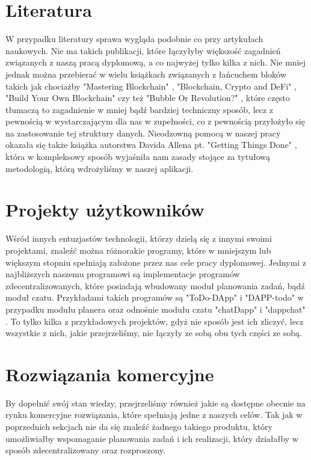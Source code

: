\section{Literatura}
\label{sec:Literatura}
W przypadku literatury sprawa wygląda podobnie co przy artykułach naukowych. Nie ma takich publikacji, które łączyłyby większość zagadnień związanych z naszą pracą dyplomową, a co najwyżej tylko kilka z nich. Nie mniej jednak można przebierać w wielu książkach związanych z łańcuchem bloków takich jak chociażby "Mastering Blockchain" \cite{MasteringBlockchain}, "Blockchain, Crypto and DeFi" \cite{BCDF}, "Build Your Own Blockchain" \cite{BuildBlockchain} czy też "Bubble Or Revolution?" \cite{BubbleOrRevolution}, które często tłumaczą to zagadnienie w mniej bądź bardziej techniczny sposób, lecz z pewnością w wystarczającym dla nas w zupełności, co z pewnością przyłożyło się na zastosowanie tej struktury danych. Nieodzowną pomocą w naszej pracy okazała się także książka autorstwa Davida Allena pt. "Getting Things Done" \cite{GTD}, która w kompleksowy sposób wyjaśniła nam zasady stojące za tytułową metodologią, którą wdrożyliśmy w naszej aplikacji. %


\section{Projekty użytkowników}
\label{sec:ProjektyUzytkownikow}
Wśród innych entuzjastów technologii, którzy dzielą się z innymi swoimi projektami, znaleźć można różnorakie programy, które w mniejszym lub większym stopniu spełniają założone przez nas cele pracy dyplomowej. Jednymi z najbliższych naszemu programowi są implementacje programów zdecentralizowanych, które posiadają wbudowany moduł planowania zadań, bądź moduł czatu. Przykładami takich programów są "ToDo-DApp" \cite{ToDo_DApp} i "DAPP-todo" \cite{DAPP_todo} w przypadku modułu planera oraz odnośnie modułu czatu "chatDapp" \cite{chatDapp} i "dappchat" \cite{dappchat}. To tylko kilka z przykładowych projektów, gdyż nie sposób jest ich zliczyć, lecz wszystkie z nich, jakie przejrzeliśmy, nie łączyły ze sobą obu tych części ze sobą.%

\section{Rozwiązania komercyjne}
\label{sec:RozwiazaniaKomercyjne}
By dopełnić swój stan wiedzy, przejrzeliśmy również jakie są dostępne obecnie na rynku komercyjne rozwiązania, które spełniają jedne z naszych celów. Tak jak w poprzednich sekcjach nie da się znaleźć żadnego takiego produktu, który umożliwiałby wspomaganie planowania zadań i ich realizacji, który działałby w sposób zdecentralizowany oraz rozproszony.%

